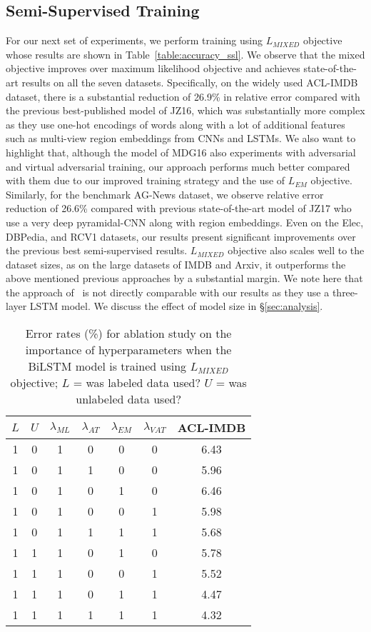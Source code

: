 \documentclass[letterpaper]{article}
\newcommand{\citet}[1]{\citeauthor{#1} \shortcite{#1}}
\begin{document}
\subsection{Semi-Supervised Training}
For our next set of experiments, we perform training using $L_{\textit{MIXED}}$ objective whose results are shown in Table~\ref{table:accuracy_ssl}. We observe that the mixed objective improves over maximum likelihood objective and achieves state-of-the-art results on all the seven datasets. Specifically, on the widely used ACL-IMDB dataset, there is a substantial reduction of 26.9\% in relative error compared with the previous best-published model of JZ16, which was substantially more complex as they use one-hot encodings of words along with a lot of additional features such as multi-view region embeddings from CNNs and LSTMs. We also want to highlight that, although the model of MDG16 also experiments with adversarial and virtual adversarial training, our approach performs much better compared with them due to our improved training strategy and the use of $L_{\textit{EM}}$ objective. Similarly, for the benchmark AG-News dataset, we observe relative error reduction of 26.6\% compared with previous state-of-the-art model of JZ17 who use a very deep pyramidal-CNN along with region embeddings. Even on the Elec, DBPedia, and RCV1 datasets, our results present significant improvements over the previous best semi-supervised results. $L_{\textit{MIXED}}$ objective also scales well to the dataset sizes, as on the large datasets of IMDB and Arxiv, it outperforms the above mentioned previous approaches by a substantial margin. We note here that the approach of~\citet{howard2018universal} is not directly comparable with our results as they use a three-layer LSTM model. We discuss the effect of model size in \S\ref{sec:analysis}.

\begin{table}[t]
\small
\centering
\begin{tabular}{@{} c c c c c c | c @{}} 
\toprule
$L$ & $U$ & $\lambda_{\textit{ML}}$ & $\lambda_{\textit{AT}}$ & $\lambda_{\textit{EM}}$ & $\lambda_{\textit{VAT}}$ & ACL-IMDB \\
\midrule
1 & 0 & 1 & 0 & 0 & 0 & 6.43 \\
1 & 0 & 1 & 1 & 0 & 0 & 5.96 \\
1 & 0 & 1 & 0 & 1 & 0 & 6.46 \\
1 & 0 & 1 & 0 & 0 & 1 & 5.98 \\
1 & 0 & 1 & 1 & 1 & 1 & 5.68 \\
\midrule
1 & 1 & 1 & 0 & 1 & 0 & 5.78 \\
1 & 1 & 1 & 0 & 0 & 1 & 5.52 \\
1 & 1 & 1 & 0 & 1 & 1 & 4.47 \\
1 & 1 & 1 & 1 & 1 & 1 & 4.32 \\
\bottomrule
\end{tabular}
\caption{Error rates (\%) for ablation study on the importance of hyperparameters when the BiLSTM model is trained using $L_{\textit{MIXED}}$ objective; $L$ = was labeled data used? $U$ = was unlabeled data used?}
\label{table:ablation_unsup}
\end{table}
\end{document}
